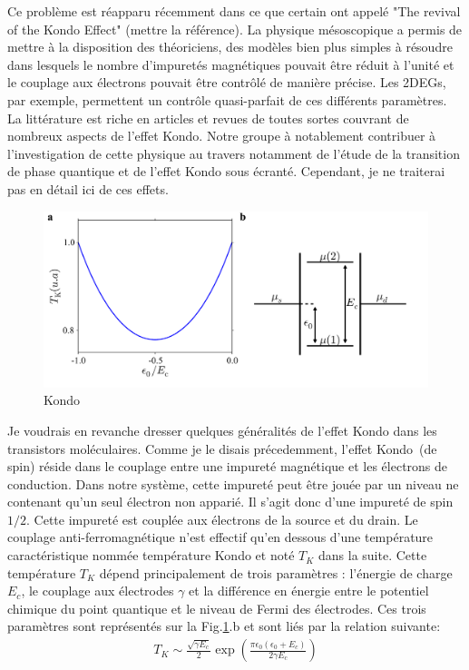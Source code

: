 Ce problème est réapparu récemment dans ce que certain ont appelé "The revival of the Kondo Effect" (mettre la référence). La physique mésoscopique a permis de mettre à la disposition des théoriciens, des modèles bien plus simples à résoudre dans lesquels le nombre d'impuretés magnétiques pouvait être réduit à l'unité et le couplage aux électrons pouvait être contrôlé de manière précise. Les 2DEGs, par exemple, permettent un contrôle quasi-parfait de ces différents paramètres. La littérature est riche en articles et revues de toutes sortes couvrant de nombreux aspects de l'effet Kondo. Notre groupe à notablement contribuer à l'investigation de cette physique au travers notamment de l'étude de la transition de phase quantique et de l'effet Kondo sous écranté. Cependant, je ne traiterai pas en détail ici de ces effets.

\begin{figure}
\includegraphics[scale=0.5]{Theorie/Transport/figure6/figure6.pdf} 
\caption{Kondo}
\label{Kondo_param}
\end{figure}


Je voudrais en revanche dresser quelques généralités de l'effet Kondo dans les transistors moléculaires. Comme je le disais précedemment, l'effet Kondo~(de spin) réside dans le couplage entre une impureté magnétique et les électrons de conduction. Dans notre système, cette impureté peut être jouée par un niveau ne contenant qu'un seul électron non apparié. Il s'agit donc d'une impureté de spin $1/2$. Cette impureté est couplée aux électrons de la source et du drain. Le couplage anti-ferromagnétique n'est effectif qu'en dessous d'une température caractéristique nommée température Kondo et noté $T_K$ dans la suite. Cette température $T_K$ dépend principalement de trois paramètres : l'énergie de charge $E_c$, le couplage aux électrodes $\gamma$ et la différence en énergie entre le potentiel chimique du point quantique et le niveau de Fermi des électrodes. Ces trois paramètres sont représentés sur la Fig.\ref{Kondo_param}.b et sont liés par la relation suivante:
\begin{eqnarray}
T_K \sim \frac{\sqrt{\gamma E_c}}{2} \exp(\frac{\pi \epsilon_0(\epsilon_0 + E_c)}{2\gamma E_c})
\end{eqnarray}

